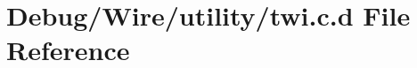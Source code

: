 \hypertarget{_debug_2_wire_2utility_2twi_8c_8d}{\section{\-Debug/\-Wire/utility/twi.c.\-d \-File \-Reference}
\label{_debug_2_wire_2utility_2twi_8c_8d}
}
